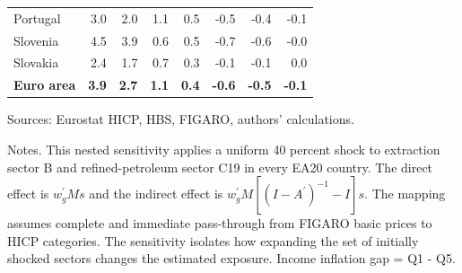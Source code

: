 \documentclass[11pt]{article}
\begin{document}
\begin{table}[H]
\begin{tabular}{lrrrrrrr}
Portugal & 3.0 & 2.0 & 1.1 & 0.5 & -0.5 & -0.4 & -0.1
 \\
Slovenia & 4.5 & 3.9 & 0.6 & 0.5 & -0.7 & -0.6 & -0.0
 \\
Slovakia & 2.4 & 1.7 & 0.7 & 0.3 & -0.1 & -0.1 & 0.0
 \\
\midrule
\textbf{Euro area} & \textbf{3.9} & \textbf{2.7} & \textbf{1.1} & \textbf{0.4} & \textbf{-0.6} & \textbf{-0.5} & \textbf{-0.1}
 \\
\bottomrule
\end{tabular}
\par\vspace{0.35em}\footnotesize\noindent Sources: Eurostat HICP, HBS, FIGARO, authors' calculations.
\par\vspace{0.25em}\footnotesize\noindent Notes. This nested sensitivity applies a uniform 40 percent shock to extraction sector B and refined-petroleum sector C19 in every EA20 country. The direct effect is $w_g^{\prime}Ms$ and the indirect effect is $w_g^{\prime}M[(I-A^{\prime})^{-1}-I]s$. The mapping assumes complete and immediate pass-through from FIGARO basic prices to HICP categories. The sensitivity isolates how expanding the set of initially shocked sectors changes the estimated exposure. Income inflation gap = Q1 - Q5.
\end{table}
\vspace{0.6em}
\end{document}
